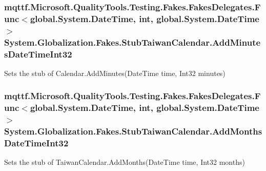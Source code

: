\hypertarget{class_system_1_1_globalization_1_1_fakes_1_1_stub_taiwan_calendar_a920f4dd62a95f822d64b25ce57522d76}{
\subsubsection[{Add\-Minutes\-Date\-Time\-Int32}]{\setlength{\rightskip}{0pt plus 5cm}mqttf.\-Microsoft.\-Quality\-Tools.\-Testing.\-Fakes.\-Fakes\-Delegates.\-Func$<$global.\-System.\-Date\-Time, int, global.\-System.\-Date\-Time$>$ System.\-Globalization.\-Fakes.\-Stub\-Taiwan\-Calendar.\-Add\-Minutes\-Date\-Time\-Int32}}\label{class_system_1_1_globalization_1_1_fakes_1_1_stub_taiwan_calendar_a920f4dd62a95f822d64b25ce57522d76}


Sets the stub of Calendar.\-Add\-Minutes(\-Date\-Time time, Int32 minutes)

\hypertarget{class_system_1_1_globalization_1_1_fakes_1_1_stub_taiwan_calendar_a40d3900b349f238013ae0be5c115b935}{
\subsubsection[{Add\-Months\-Date\-Time\-Int32}]{\setlength{\rightskip}{0pt plus 5cm}mqttf.\-Microsoft.\-Quality\-Tools.\-Testing.\-Fakes.\-Fakes\-Delegates.\-Func$<$global.\-System.\-Date\-Time, int, global.\-System.\-Date\-Time$>$ System.\-Globalization.\-Fakes.\-Stub\-Taiwan\-Calendar.\-Add\-Months\-Date\-Time\-Int32}}\label{class_system_1_1_globalization_1_1_fakes_1_1_stub_taiwan_calendar_a40d3900b349f238013ae0be5c115b935}


Sets the stub of Taiwan\-Calendar.\-Add\-Months(\-Date\-Time time, Int32 months)

